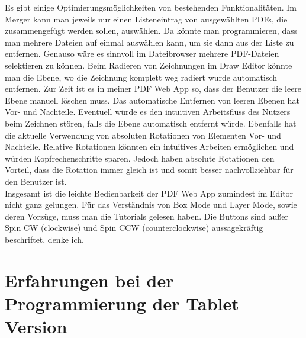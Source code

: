 Es gibt einige Optimierungsmöglichkeiten von bestehenden Funktionalitäten. Im Merger kann man jeweils nur einen Listeneintrag von ausgewählten PDFs, die zusammengefügt werden sollen, auswählen. Da könnte man programmieren, dass man mehrere Dateien auf einmal auswählen kann, um sie dann aus der Liste zu entfernen. Genauso wäre es sinnvoll im Dateibrowser mehrere PDF-Dateien selektieren zu können. Beim Radieren von Zeichnungen im Draw Editor könnte man die Ebene, wo die Zeichnung komplett weg radiert wurde automatisch entfernen. Zur Zeit ist es in meiner PDF Web App so, dass der Benutzer die leere Ebene manuell löschen muss. Das automatische Entfernen von leeren Ebenen hat Vor- und Nachteile. Eventuell würde es den intuitiven Arbeitsfluss des Nutzers beim Zeichnen stören, falls die Ebene automatisch entfernt würde. Ebenfalls hat die aktuelle Verwendung von absoluten Rotationen von Elementen Vor- und Nachteile. Relative Rotationen könnten ein intuitives Arbeiten ermöglichen und würden Kopfrechenschritte sparen. Jedoch haben absolute Rotationen den Vorteil, dass die Rotation immer gleich ist und somit besser nachvollziehbar für den Benutzer ist. \\
Insgesamt ist die leichte Bedienbarkeit der PDF Web App zumindest im Editor nicht ganz gelungen. Für das Verständnis von Box Mode und Layer Mode, sowie deren Vorzüge, muss man die Tutorials gelesen haben. Die Buttons sind außer Spin CW (clockwise) und Spin CCW (counterclockwise) aussagekräftig beschriftet, denke ich. 

\section{Erfahrungen bei der Programmierung der Tablet Version}




